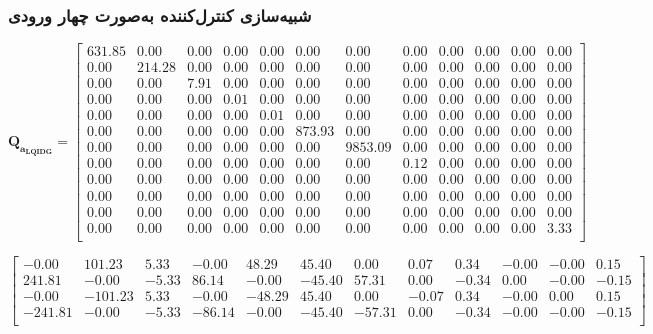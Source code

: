 \subsubsection{شبیه‌سازی کنترل‌کننده به‌صورت چهار ورودی}\label{mimo_sim}
\setcounter{MaxMatrixCols}{20}


\begin{equation*}
	\boldsymbol{Q_{a_{LQIDG}}} = 
	\begin{bmatrix}
		631.85 & 0.00 & 0.00 & 0.00 & 0.00 & 0.00 & 0.00 & 0.00 & 0.00 & 0.00 & 0.00 & 0.00\\ 
		0.00 & 214.28 & 0.00 & 0.00 & 0.00 & 0.00 & 0.00 & 0.00 & 0.00 & 0.00 & 0.00 & 0.00\\ 
		0.00 & 0.00 & 7.91 & 0.00 & 0.00 & 0.00 & 0.00 & 0.00 & 0.00 & 0.00 & 0.00 & 0.00\\ 
		0.00 & 0.00 & 0.00 & 0.01 & 0.00 & 0.00 & 0.00 & 0.00 & 0.00 & 0.00 & 0.00 & 0.00\\ 
		0.00 & 0.00 & 0.00 & 0.00 & 0.01 & 0.00 & 0.00 & 0.00 & 0.00 & 0.00 & 0.00 & 0.00\\ 
		0.00 & 0.00 & 0.00 & 0.00 & 0.00 & 873.93 & 0.00 & 0.00 & 0.00 & 0.00 & 0.00 & 0.00\\ 
		0.00 & 0.00 & 0.00 & 0.00 & 0.00 & 0.00 & 9853.09 & 0.00 & 0.00 & 0.00 & 0.00 & 0.00\\ 
		0.00 & 0.00 & 0.00 & 0.00 & 0.00 & 0.00 & 0.00 & 0.12 & 0.00 & 0.00 & 0.00 & 0.00\\ 
		0.00 & 0.00 & 0.00 & 0.00 & 0.00 & 0.00 & 0.00 & 0.00 & 0.00 & 0.00 & 0.00 & 0.00\\ 
		0.00 & 0.00 & 0.00 & 0.00 & 0.00 & 0.00 & 0.00 & 0.00 & 0.00 & 0.00 & 0.00 & 0.00\\ 
		0.00 & 0.00 & 0.00 & 0.00 & 0.00 & 0.00 & 0.00 & 0.00 & 0.00 & 0.00 & 0.00 & 0.00\\ 
		0.00 & 0.00 & 0.00 & 0.00 & 0.00 & 0.00 & 0.00 & 0.00 & 0.00 & 0.00 & 0.00 & 3.33\\ 
		
	\end{bmatrix}
\end{equation*}

\begin{equation*}
	\begin{bmatrix}
		-0.00 & 101.23 & 5.33 & -0.00 & 48.29 & 45.40 & 0.00 & 0.07 & 0.34 & -0.00 & -0.00 & 0.15\\ 
		241.81 & -0.00 & -5.33 & 86.14 & -0.00 & -45.40 & 57.31 & 0.00 & -0.34 & 0.00 & -0.00 & -0.15\\ 
		-0.00 & -101.23 & 5.33 & -0.00 & -48.29 & 45.40 & 0.00 & -0.07 & 0.34 & -0.00 & 0.00 & 0.15\\ 
		-241.81 & -0.00 & -5.33 & -86.14 & -0.00 & -45.40 & -57.31 & 0.00 & -0.34 & -0.00 & -0.00 & -0.15\\ 
	\end{bmatrix}
\end{equation*}


